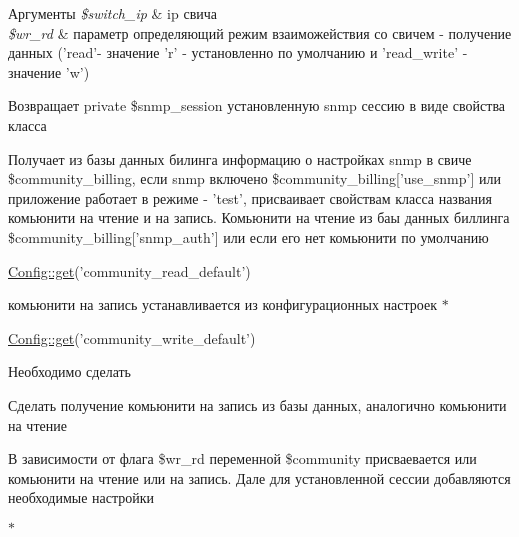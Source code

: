 \begin{DoxyParams}{Аргументы}
{\em \$switch\-\_\-ip} & ip свича \\
\hline
{\em \$wr\-\_\-rd} & параметр определяющий режим взаиможействия со свичем -\/ получение данных ('read'-\/ значение 'r' -\/ установленно по умолчанию и 'read\-\_\-write' -\/ значение 'w')\\
\hline
\end{DoxyParams}
\begin{DoxyReturn}{Возвращает}
private \$snmp\-\_\-session установленную snmp сессию в виде свойства класса
\end{DoxyReturn}
Получает из базы данных билинга информацию о настройках snmp в свиче \$community\-\_\-billing, если snmp включено \$community\-\_\-billing\mbox{[}'use\-\_\-snmp'\mbox{]} или приложение работает в режиме -\/ 'test', присваивает свойствам класса названия комьюнити на чтение и на запись. Комьюнити на чтение из баы данных биллинга \$community\-\_\-billing\mbox{[}'snmp\-\_\-auth'\mbox{]} или если его нет комьюнити по умолчанию 
\begin{DoxyCode}
\hyperlink{class_config_a15e2679f2a8f6fa4d60757f4d65413ac}{Config::get}(\textcolor{stringliteral}{'community\_read\_default'})
\end{DoxyCode}
 комьюнити на запись устанавливается из конфигурационных настроек $\ast$
\begin{DoxyCode}
\hyperlink{class_config_a15e2679f2a8f6fa4d60757f4d65413ac}{Config::get}(\textcolor{stringliteral}{'community\_write\_default'})
\end{DoxyCode}
 \begin{DoxyRefDesc}{Необходимо сделать}
\item[\hyperlink{todo__todo000001}{Необходимо сделать}]Сделать получение комьюнити на запись из базы данных, аналогично комьюнити на чтение\end{DoxyRefDesc}


В зависимости от флага \$wr\-\_\-rd переменной \$community присваевается или комьюнити на чтение или на запись. Дале для установленной сессии добавляются необходимые настройки
\begin{DoxyItemize}
\item $\ast$

\end{DoxyItemize}

